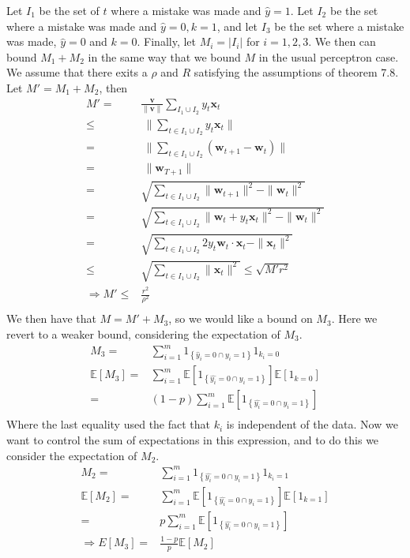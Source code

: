 \documentclass{article}
\newcommand{\V}[1]{\boldsymbol{#1}}
\newcommand{\E}[0]{\mathbb{E}}
\begin{document}
Let $I_1$ be the set of $t$ where a mistake was made and
$\hat{y}=1$.  Let $I_2$ be the set where a mistake was made and
$\hat{y} = 0, k = 1$, and let $I_3$ be the set where a mistake was
made, $\hat{y} = 0$ and $k = 0$. Finally, let $M_i = |I_i|$ for $i =
1,2,3$. We then can bound $M_1 + M_2$ in the same way that we bound
$M$ in the usual perceptron case.  We assume that there exits a $\rho$
and $R$ satisfying the assumptions of theorem 7.8. Let $M' = M_1 + M_2$, then
\begin{align*}
M' =& \frac{\V{v}}{\|\V{v}\|}\sum_{I_1 \cup I_2}
y_t\V{x}_t \\
 \leq & \  \|\sum_{t \in I_1 \cup I_2} y_t \V{x}_t \|\\
= & \ \|\sum_{t \in I_1 \cup I_2} (\V{w}_{t+1} - \V{w}_t) \| \\
= & \ \|\V{w}_{T+1} \| \\
= & \sqrt{\sum_{t \in I_1 \cup I_2} \|  \V{w}_{t+1}\|^2 -
  \|\V{w}_t\|^2 }\\
= & \sqrt{\sum_{t \in I_1 \cup I_2} \|  \V{w}_{t} + y_t\V{x}_t\|^2 -
  \|\V{w}_t\|^2 }\\
= & \sqrt{\sum_{t \in I_1 \cup I_2} 2y_t\V{w}_t\cdot \V{x}_t -
  \|\V{x}_t\|^2} \\
\leq & \sqrt{\sum_{t \in I_1 \cup I_2} \|\V{x}_t\|^2} \leq
\sqrt{M'r^2} \\
\Rightarrow M' \leq &\frac{r^2}{\rho^2} \\
\end{align*}
We then have that $M = M' + M_3$, so we would like a bound on $M_3$.
Here we revert to a weaker bound, considering the expectation of
$M_3$.
\begin{align*}
M_3 =& \sum_{i=1}^m 1_{\left\{\hat{y}_i = 0 \cap y_i = 1\right\}}1_{k_i = 0} \\
\E[M_3] = & \sum_{i=1}^m \E[1_{\left\{\hat{y_i} = 0 \cap y_i = 1\right\}}]\E[1_{k = 0}] \\
 = & (1 - p)\sum_{i=1}^m \E[1_{\left\{\hat{y_i} = 0 \cap y_i = 1\right\}}]\\
\end{align*}
Where the last equality used the fact that $k_i$ is independent of the data.  Now we want to control the sum of expectations in this expression, and to do this we consider the expectation of $M_2$.
\begin{align*}
M_2 = & \sum_{i=1}^m 1_{\left\{\hat{y_i} = 0 \cap y_i = 1\right\}}1_{k_i = 1} \\
\E[M_2] = & \sum_{i=1}^m \E[1_{\left\{\hat{y_i} = 0 \cap y_i = 1\right\}}]\E[1_{k = 1}] \\
= & p\sum_{i=1}^m \E[1_{\left\{\hat{y_i} = 0 \cap y_i = 1\right\}}]\\
\Rightarrow E[M_3] = & \frac{1-p}{p}\E[M_2]
\end{align*}
\end{document}
